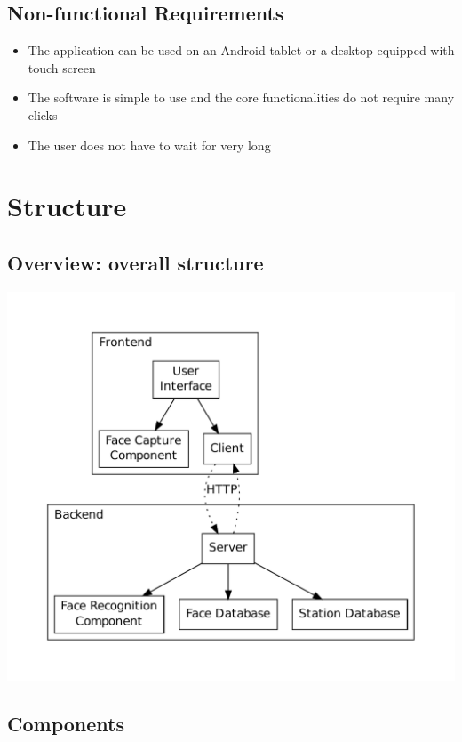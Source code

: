 \documentclass[11pt]{article}
\begin{document}
\subsection{Non-functional Requirements}

\begin{itemize}
\item{The application can be used on an Android tablet or a desktop equipped with touch screen}
\item{The software is simple to use and the core functionalities do not require many clicks}
\item{The user does not have to wait for very long}  
\end{itemize}

\section{Structure}

\subsection{Overview: overall structure}
\includegraphics[scale=0.5]{components.pdf}


\subsection{Components}
\end{document}
